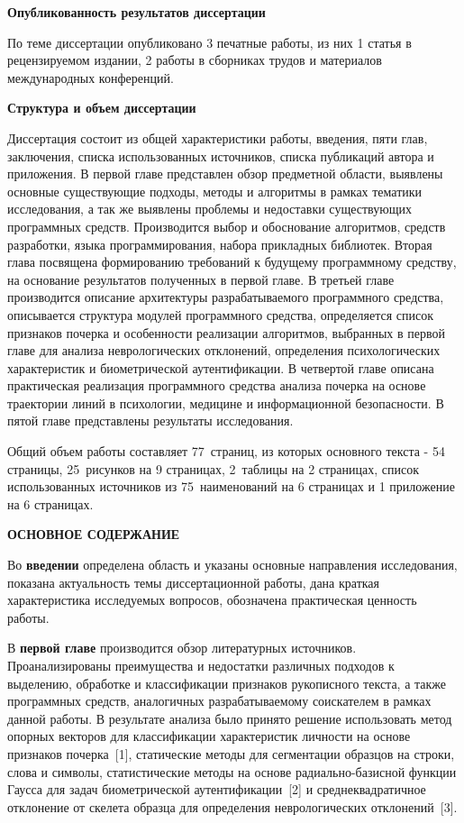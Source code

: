 \bigskip
\textbf{Опубликованность результатов диссертации}
\bigskip

По теме диссертации опубликовано 3 печатные работы, из них 1 статья в рецензируемом издании, 2 работы в сборниках трудов и материалов международных конференций.

\bigskip
\textbf{Структура и объем диссертации}
\bigskip

Диссертация состоит из общей характеристики работы, введения, пяти глав, заключения, списка использованных источников, списка публикаций автора и приложения. В первой главе представлен обзор предметной области, выявлены основные существующие подходы, методы и алгоритмы в рамках тематики исследования, а так же выявлены проблемы и недоставки существующих программных средств. Производится выбор и обоснование алгоритмов, средств разработки, языка программирования, набора прикладных библиотек. Вторая глава посвящена формированию требований к будущему программному средству, на основание результатов полученных в первой главе. В третьей главе производится описание архитектуры разрабатываемого программного средства, описывается структура модулей программного средства, определяется список признаков почерка и особенности реализации алгоритмов, выбранных в первой главе для анализа неврологических отклонений, определения психологических характеристик и биометрической аутентификации. В четвертой главе описана практическая реализация программного средства анализа почерка на основе траектории линий в психологии, медицине и информационной безопасности. В пятой главе представлены результаты исследования.

Общий объем работы составляет 77~страниц, из которых основного текста - 54 страницы, 25~рисунков на 9 страницах, 2~таблицы на 2 страницах, список использованных источников из 75~наименований на 6 страницах и 1 приложение на 6 страницах.

\begin{center}
{\bfseries ОСНОВНОЕ СОДЕРЖАНИЕ}
\end{center}

Во \textbf{введении} определена область и указаны основные направления исследования, показана актуальность темы диссертационной работы, дана краткая характеристика исследуемых вопросов, обозначена практическая ценность работы.

В \textbf{первой главе} производится обзор литературных источников. Проанализированы преимущества и недостатки различных подходов к выделению, обработке и классификации признаков рукописного текста, а также программных средств, аналогичных разрабатываемому соискателем в рамках данной работы. В результате анализа было принято решение использовать метод опорных векторов для классификации характеристик личности на основе признаков почерка~[1], статические методы для сегментации образцов на строки, слова и символы, статистические методы на основе радиально-базисной функции Гаусса для задач биометрической аутентификации~[2] и среднеквадратичное отклонение от скелета образца для определения неврологических отклонений~[3].

